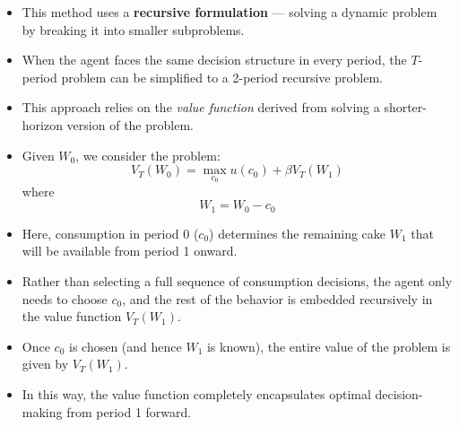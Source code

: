 \documentclass[12pt]{article}
\begin{document}
\begin{itemize}
    \item This method uses a \textbf{recursive formulation} — solving a dynamic problem by breaking it into smaller subproblems.

    \item When the agent faces the same decision structure in every period, the \( T \)-period problem can be simplified to a 2-period recursive problem.

    \item This approach relies on the \textit{value function} derived from solving a shorter-horizon version of the problem.

    \item Given \( W_0 \), we consider the problem:
    \[
    V_T(W_0) = \max_{c_0} u(c_0) + \beta V_{T}(W_1) \tag{5}
    \]
    where
    \[
    W_1 = W_0 - c_0
    \]

    \item Here, consumption in period 0 (\( c_0 \)) determines the remaining cake \( W_1 \) that will be available from period 1 onward.

    \item Rather than selecting a full sequence of consumption decisions, the agent only needs to choose \( c_0 \), and the rest of the behavior is embedded recursively in the value function \( V_T(W_1) \).

    \item Once \( c_0 \) is chosen (and hence \( W_1 \) is known), the entire value of the problem is given by \( V_T(W_1) \).

    \item In this way, the value function completely encapsulates optimal decision-making from period 1 forward.
\end{itemize}
\end{document}
